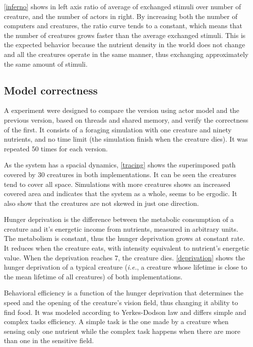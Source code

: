 \documentclass{aamas2017}
\begin{document}
\autoref{inferno} shows in left axis ratio of average of exchanged stimuli over number of creature, and the number of actors in right. By increasing both the number of computers and creatures, the ratio curve tends to a constant, which means that the number of creatures grows faster than the average exchanged stimuli. This is the expected behavior because the nutrient density in the world does not change and all the creatures operate in the same manner, thus exchanging approximately the same amount of stimuli.


\subsection{Model correctness}
A experiment were designed to compare the version using actor model and the previous version, based on threads and shared memory, and verify the correctness of the first. It consists of a foraging simulation with one creature and ninety nutrients, and no time limit (the simulation finish when the creature dies). It was repeated 50 times for each version. 

As the system has a spacial dynamics, \autoref{tracing} shows the superimposed path covered by 30 creatures in both implementations. It can be seen the creatures tend to cover all space. Simulations with more creatures shows an increased covered area and indicates that the system as a whole, seems to be ergodic\cite{Cornfeld2012}. It also show that the creatures are not skewed in just one direction.

Hunger deprivation is the difference between the metabolic consumption of a creature and it's energetic income from nutrients, measured in arbitrary units\cite{Campos}. The metabolism is constant, thus the hunger deprivation grows at constant rate. It reduces when the creature eats, with intensity equivalent to nutrient's energetic value. When the deprivation reaches 7, the creature dies. \autoref{deprivation} shows the hunger deprivation of a typical creature (\textit{i.e.}, a creature whose lifetime is close to the mean lifetime of all creatures) of both implementations. 

Behavioral efficiency is a function of the hunger deprivation that determines the speed and the opening of the creature's vision field, thus changing it ability to find food. It was modeled according to Yerkes-Dodson law \cite{Yerkes1908} and differs simple and complex tasks efficiency. A simple task is the one made by a creature when sensing only one nutrient while the complex task happens when there are more than one in the sensitive field. 
\end{document}
